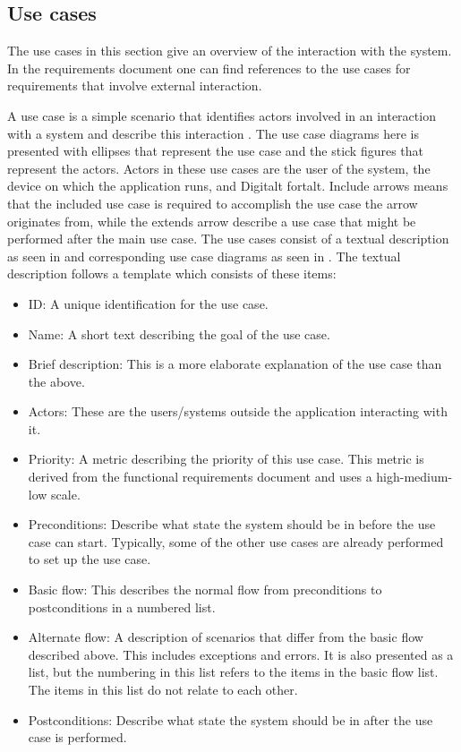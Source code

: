 \subsection{Use cases}
\label{subsec:use_cases}

The use cases in this section give an overview of the interaction with the system. In the requirements document one can find references to the use cases for requirements that involve external interaction.\newline

A use case is a simple scenario that identifies actors involved in an interaction with a system and describe this interaction \cite[p.106-107]{Sommerville}. The use case diagrams here is presented with ellipses that represent the use case and the stick figures that represent the actors. Actors in these use cases are the user of the system, the device on which the application runs, and Digitalt fortalt. Include arrows means that the included use case is required to accomplish the use case the arrow originates from, while the extends arrow describe a use case that might be performed after the main use case. The use cases consist of a textual description as seen in \textbf{} and corresponding use case diagrams as seen in \textbf{}. The textual description follows a template which consists of these items:
\begin{itemize}
\item ID: A unique identification for the use case.
\item Name: A short text describing the goal of the use case.
\item Brief description: This is a more elaborate explanation of the use case than the above.
\item Actors: These are the users/systems outside the application interacting with it.
\item Priority: A metric describing the priority of this use case. This metric is derived from the functional requirements document and uses a high-medium-low scale.
\item Preconditions: Describe what state the system should be in before the use case can start. Typically, some of the other use cases are already performed to set up the use case.
\item Basic flow: This describes the normal flow from preconditions to postconditions in a numbered list.
\item Alternate flow: A description of scenarios that differ from the basic flow described above. This includes exceptions and errors. It is also presented as a list, but the numbering in this list refers to the items in the basic flow list. The items in this list do not relate to each other.
\item Postconditions: Describe what state the system should be in after the use case is performed.
\end{itemize}
